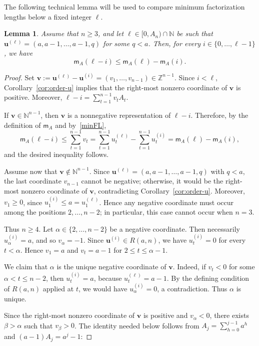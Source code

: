 \documentclass[12pt,a4paper]{amsart}
\newtheorem{lemma}[theorem]{Lemma}
\theoremstyle{definition}
\begin{document}
The following technical lemma will be used to compare minimum factorization lengths below a fixed integer $\ell$.

\begin{lemma}\label{lem:subtract_special}
Assume that $n\ge 3$, and let $\ell\in[0,A_n)\cap\mathbb{N}$ be such that $\mathbf u^{(\ell)}=(a,a-1,\ldots,a-1,q)$ for some $q<a$. Then, for every $i\in\{0,\ldots,\ell-1\}$, we have
\[
\mathsf{m}_A(\ell-i)\le \mathsf{m}_A(\ell)-\mathsf{m}_A(i).
\]
\end{lemma}

\begin{proof}
Set $\mathbf v:=\mathbf u^{(\ell)}-\mathbf u^{(i)}
=(v_1,\ldots,v_{n-1})\in\mathbb Z^{n-1}$. Since $i<\ell$,
Corollary~\ref{cor:order-u} implies that the right-most nonzero coordinate of
$\mathbf v$ is positive. Moreover,
$\ell-i=\sum_{t=1}^{n-1}v_tA_t$.

If $\mathbf v\in\mathbb N^{n-1}$, then $\mathbf v$ is a nonnegative
representation of $\ell-i$. Therefore, by the definition of $\mathsf m_A$ and by~\eqref{minFL},
\[
\mathsf m_A(\ell-i)\le \sum_{t=1}^{n-1}v_t
=
\sum_{t=1}^{n-1}u_t^{(\ell)}
-
\sum_{t=1}^{n-1}u_t^{(i)}
=
\mathsf m_A(\ell)-\mathsf m_A(i),
\]
and the desired inequality follows.

Assume now that $\mathbf v\notin\mathbb N^{n-1}$. Since
$\mathbf u^{(\ell)}=(a,a-1,\ldots,a-1,q)$ with $q<a$, the last coordinate
$v_{n-1}$ cannot be negative; otherwise, it would be the right-most nonzero
coordinate of $\mathbf v$, contradicting Corollary~\ref{cor:order-u}. Moreover,
$v_1\ge0$, since $u_1^{(i)}\le a=u_1^{(\ell)}$. Hence any negative coordinate
must occur among the positions $2,\ldots,n-2$; in particular, this case cannot
occur when $n=3$.

Thus $n\ge4$. Let $\alpha\in\{2,\ldots,n-2\}$ be a negative coordinate. Then
necessarily $u_\alpha^{(i)}=a$, and so $v_\alpha=-1$. Since
$\mathbf u^{(i)}\in R(a,n)$, we have $u_t^{(i)}=0$ for every $t<\alpha$.
Hence $v_1=a$ and $v_t=a-1$ for $2\le t\le\alpha-1$.

We claim that $\alpha$ is the unique negative coordinate of $\mathbf v$. Indeed,
if $v_t<0$ for some $\alpha<t\le n-2$, then $u_t^{(i)}=a$, because
$u_t^{(\ell)}=a-1$. By the defining condition of $R(a,n)$ applied at $t$, we
would have $u_\alpha^{(i)}=0$, a contradiction. Thus $\alpha$ is unique.

Since the right-most nonzero coordinate of $\mathbf v$ is positive and
$v_\alpha<0$, there exists $\beta>\alpha$ such that $v_\beta>0$. The identity
needed below follows from $A_j=\sum_{h=0}^{j-1}a^h$ and
$(a-1)A_j=a^j-1$:


\end{proof}
\end{document}

